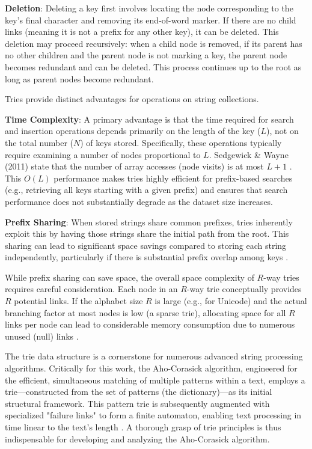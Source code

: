 \textbf{Deletion}: Deleting a key first involves locating the node corresponding to the key's final character and removing its end-of-word marker. If there are no child links (meaning it is not a prefix for any other key), it can be deleted. This deletion may proceed recursively: when a child node is removed, if its parent has no other children and the parent node is not marking a key, the parent node becomes redundant and can be deleted. This process continues up to the root as long as parent nodes become redundant.


Tries provide distinct advantages for operations on string collections.

\textbf{Time Complexity}: A primary advantage is that the time required for search and insertion operations depends primarily on the length of the key ($L$), not on the total number ($N$) of keys stored. Specifically, these operations typically require examining a number of nodes proportional to $L$. Sedgewick \& Wayne (2011) state that the number of array accesses (node visits) is at most $L+1$ \cite{SedgewickWayne2011}. This $O(L)$ performance makes tries highly efficient for prefix-based searches (e.g., retrieving all keys starting with a given prefix) and ensures that search performance does not substantially degrade as the dataset size increases.

\textbf{Prefix Sharing}: When stored strings share common prefixes, tries inherently exploit this by having those strings share the initial path from the root. This sharing can lead to significant space savings compared to storing each string independently, particularly if there is substantial prefix overlap among keys \cite{Fredkin1960}.


While prefix sharing can save space, the overall space complexity of $R$-way tries requires careful consideration. Each node in an $R$-way trie conceptually provides $R$ potential links. If the alphabet size $R$ is large (e.g., for Unicode) and the actual branching factor at most nodes is low (a sparse trie), allocating space for all $R$ links per node can lead to considerable memory consumption due to numerous unused (null) links \cite{Knuth1998, SedgewickWayne2011}.


The trie data structure is a cornerstone for numerous advanced string processing algorithms. Critically for this work, the Aho-Corasick algorithm, engineered for the efficient, simultaneous matching of multiple patterns within a text, employs a trie---constructed from the set of patterns (the dictionary)---as its initial structural framework. This pattern trie is subsequently augmented with specialized "failure links" to form a finite automaton, enabling text processing in time linear to the text's length \cite{AhoCorasick1975}. A thorough grasp of trie principles is thus indispensable for developing and analyzing the Aho-Corasick algorithm.


